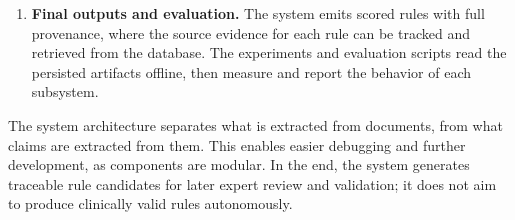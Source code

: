 \begin{enumerate}

\item \textbf{Final outputs and evaluation.} The system emits scored rules with full provenance, where the source evidence for each rule can be tracked and retrieved from the database. The experiments and evaluation scripts read the persisted artifacts offline, then measure and report the behavior of each subsystem. 

\end{enumerate}

The system architecture separates what is extracted from documents, from what claims are extracted from them. This enables easier debugging and further development, as components are modular. In the end, the system generates traceable rule candidates for later expert review and validation; it does not aim to produce clinically valid rules autonomously.


